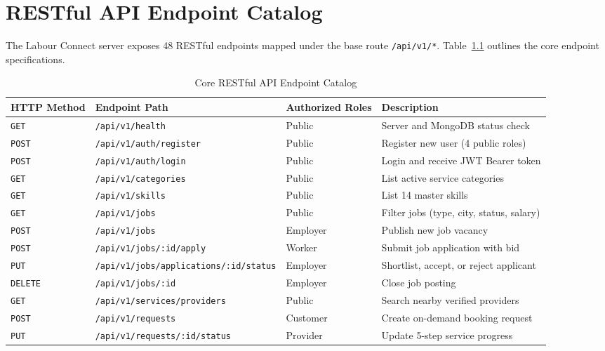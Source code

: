 \newpage
\chapter{RESTful API Endpoint Catalog}

The Labour Connect server exposes 48 RESTful endpoints mapped under the base route \texttt{/api/v1/*}. Table~\ref{tab:api_catalog} outlines the core endpoint specifications.

\begin{table}[h!]
\centering
\caption{Core RESTful API Endpoint Catalog}\label{tab:api_catalog}
\begin{tabular}{|l|l|l|l|}
\hline
\textbf{HTTP Method} & \textbf{Endpoint Path} & \textbf{Authorized Roles} & \textbf{Description} \\ \hline
\texttt{GET} & \texttt{/api/v1/health} & Public & Server and MongoDB status check \\ \hline
\texttt{POST} & \texttt{/api/v1/auth/register} & Public & Register new user (4 public roles) \\ \hline
\texttt{POST} & \texttt{/api/v1/auth/login} & Public & Login and receive JWT Bearer token \\ \hline
\texttt{GET} & \texttt{/api/v1/categories} & Public & List active service categories \\ \hline
\texttt{GET} & \texttt{/api/v1/skills} & Public & List 14 master skills \\ \hline
\texttt{GET} & \texttt{/api/v1/jobs} & Public & Filter jobs (type, city, status, salary) \\ \hline
\texttt{POST} & \texttt{/api/v1/jobs} & Employer & Publish new job vacancy \\ \hline
\texttt{POST} & \texttt{/api/v1/jobs/:id/apply} & Worker & Submit job application with bid \\ \hline
\texttt{PUT} & \texttt{/api/v1/jobs/applications/:id/status} & Employer & Shortlist, accept, or reject applicant \\ \hline
\texttt{DELETE} & \texttt{/api/v1/jobs/:id} & Employer & Close job posting \\ \hline
\texttt{GET} & \texttt{/api/v1/services/providers} & Public & Search nearby verified providers \\ \hline
\texttt{POST} & \texttt{/api/v1/requests} & Customer & Create on-demand booking request \\ \hline
\texttt{PUT} & \texttt{/api/v1/requests/:id/status} & Provider & Update 5-step service progress \\ \hline

\end{tabular}
\end{table}
